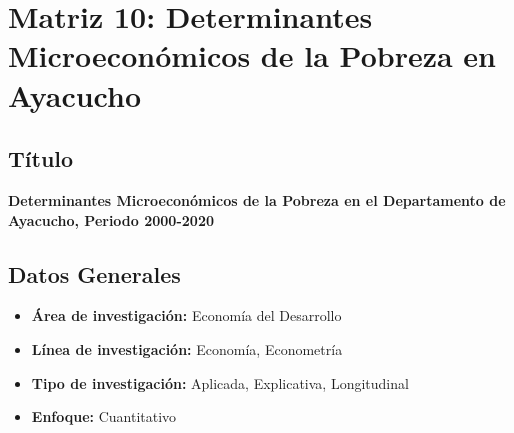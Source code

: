 \documentclass[
  man,
  floatsintext,
  longtable,
  a4paper,
  nolmodern,
  notxfonts,
  notimes,
  12pt,
  colorlinks=true,linkcolor=blue,citecolor=blue,urlcolor=blue]{apa7}
\providecommand{\tightlist}{%
  \setlength{\itemsep}{0pt}\setlength{\parskip}{0pt}}
\begin{document}
\section{Matriz 10: Determinantes Microeconómicos de la Pobreza en
Ayacucho}\label{matriz-10-determinantes-microeconuxf3micos-de-la-pobreza-en-ayacucho}

\subsection{Título}\label{tuxedtulo-9}

\textbf{Determinantes Microeconómicos de la Pobreza en el Departamento
de Ayacucho, Periodo 2000-2020}

\subsection{Datos Generales}\label{datos-generales-9}

\begin{itemize}
\tightlist
\item
  \textbf{Área de investigación:} Economía del Desarrollo
\item
  \textbf{Línea de investigación:} Economía, Econometría
\item
  \textbf{Tipo de investigación:} Aplicada, Explicativa, Longitudinal
\item
  \textbf{Enfoque:} Cuantitativo
\end{itemize}
\end{document}
